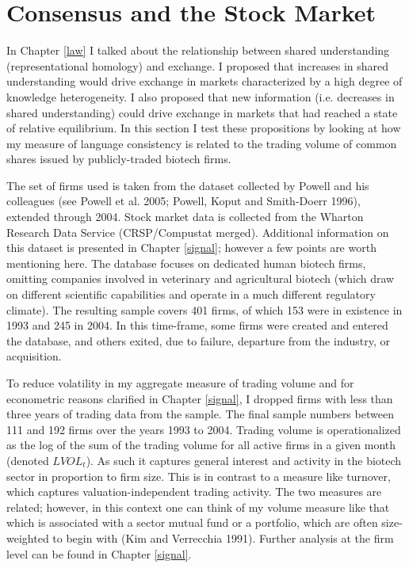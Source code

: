  
\section{Consensus and the Stock Market}

In Chapter \ref{law} I talked about the relationship between shared understanding (representational homology) and exchange.  I proposed that increases in shared understanding would drive exchange in markets characterized by a high degree of knowledge heterogeneity. I also proposed that new information (i.e. decreases in shared understanding) could drive exchange in markets that had reached a state of relative equilibrium. In this section I test these propositions by looking at how my measure of language consistency is related to the trading volume of common shares issued by publicly-traded biotech firms.

The set of firms used is taken from the dataset collected by Powell and his colleagues (see Powell et al. 2005; Powell, Koput and Smith-Doerr 1996), extended through 2004. Stock market data is collected from the Wharton Research Data Service (CRSP/Compustat merged). Additional information on this dataset is presented in Chapter \ref{signal}; however a few points are worth mentioning here. The database focuses on dedicated human biotech firms, omitting companies involved in veterinary and agricultural biotech (which draw on different scientific capabilities and operate in a much different regulatory climate). The resulting sample covers 401 firms, of which 153 were in existence in 1993 and 245 in 2004. In this time-frame, some firms were created and entered the database, and others exited, due to failure, departure from the industry, or acquisition. 

To reduce volatility in my aggregate measure of trading volume and for econometric reasons clarified in Chapter \ref{signal}, I dropped firms with less than three years of trading data from the sample. The final sample numbers between 111 and 192 firms over the years 1993 to 2004. Trading volume is operationalized as the log of the sum of the trading volume for all active firms in a given month (denoted $LVOL_t$). As such it captures general interest and activity in the biotech sector in proportion to firm size. This is in contrast to a measure like turnover, which captures valuation-independent trading activity. The two measures are related; however, in this context one can think of my volume measure like that which is associated with a sector mutual fund or a portfolio, which are often size-weighted to begin with (Kim and Verrecchia 1991). Further analysis at the firm level can be found in Chapter \ref{signal}.

